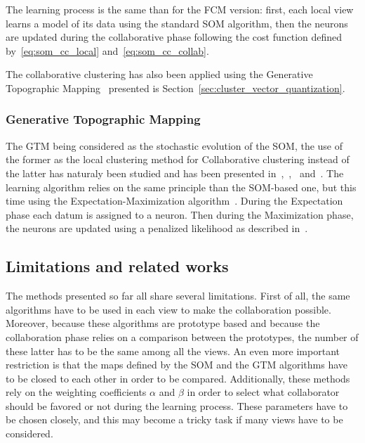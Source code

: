 \documentclass[a4paper]{report}
\begin{document}
    The learning process is the same than for the FCM version: first, each local view learns a model of its data using the standard SOM algorithm, then the neurons are updated during the collaborative phase following the cost function defined by~\ref{eq:som_cc_local} and~\ref{eq:som_cc_collab}.

    The collaborative clustering has also been applied using the Generative Topographic Mapping~\cite{bishop1998gtm} presented is Section~\ref{sec:cluster_vector_quantization}.

    \subsubsection{Generative Topographic Mapping}

    The GTM being considered as the stochastic evolution of the SOM, the use of the former as the local clustering method for Collaborative clustering instead of the latter has naturaly been studied and has been presented in~\cite{ghassany2012collaborative},~\cite{sublime2015vertical},~\cite{sublime2015horizontal} and~\cite{sublime2016collaborative}. The learning algorithm relies on the same principle than the SOM-based one, but this time using the Expectation-Maximization algorithm~\cite{dempster1977maximum}. During the Expectation phase each datum is assigned to a neuron. Then during the Maximization phase, the neurons are updated using a penalized likelihood as described in~\cite{green1990use}.\\

    \subsection{Limitations and related works}

    The methods presented so far all share several limitations. First of all, the same algorithms have to be used in each view to make the collaboration possible. Moreover, because these algorithms are prototype based and because the collaboration phase relies on a comparison between the prototypes, the number of these latter has to be the same among all the views. An even more important restriction is that the maps defined by the SOM and the GTM algorithms have to be closed to each other in order to be compared. Additionally, these methods rely on the weighting coefficients $\alpha$ and $\beta$ in order to select what collaborator should be favored or not during the learning process. These parameters have to be chosen closely, and this may become a tricky task if many views have to be considered.
\end{document}
